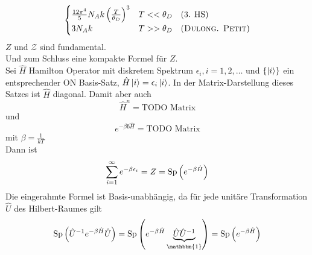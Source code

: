 \begin{enumerate}[A)]
\begin{equation}
\begin{split}
\begin{cases}
                \frac{12 \pi^4}{5} N_A k \left( \frac{T}{\theta_D} \right)^3 & T << \theta_D \quad \text{(3. HS)} \\
                3 N_A k & T >> \theta_D \quad \text{(\textsc{Dulong. Petit})}
            \end{cases}
        \end{split}
    \end{equation}
    $Z$ und $\mathcal{Z}$ sind fundamental. \\
    Und zum Schluss eine kompakte Formel für $Z$. \\
    Sei $\hat{H}$ Hamilton Operator mit diskretem Spektrum $\epsilon_i, i=1, 2, \ldots$ und $\{\left|i\right\rangle\}$ ein entsprechender ON Basis-Satz,
    $\hat{H}\left|i\right\rangle = \epsilon_i \left|i\right\rangle$. In der Matrix-Darstellung dieses Satzes ist $\hat{H}$ diagonal. Damit aber auch
    \begin{equation}
        \hat{H}^n = \text{TODO Matrix}
    \end{equation}
    und
    \begin{equation}
        e^{- \beta ß \hat{H}} = \text{TODO Matrix}
    \end{equation}
    mit $\beta = \frac{1}{k T}$\\
    Dann ist
    \begin{equation}
        \sum_{i=1}^{\infty} e^{- \beta \epsilon_i} = Z = \operatorname{Sp} \left( e^{- \beta \hat{H}} \right)
    \end{equation}
    Die eingerahmte Formel ist Basis-unabhängig, da für jede unitäre Transformation $\hat{U}$ des Hilbert-Raumes gilt
    \begin{equation}
    \Sp \left( \hat{U}^{-1} e^{-\beta \hat{H}} \hat{U} \right) = \Sp \left( e^{-\beta \hat{H}} \underbrace{\hat{U} \hat{U}^{-1}}_{\mathbbm{1}} \right) = \Sp \left( e^{-\beta \hat{H}} \right) 
\end{equation}
\end{enumerate}